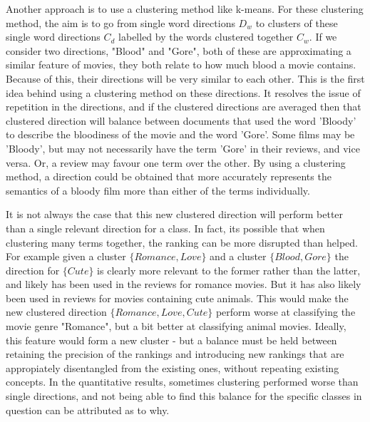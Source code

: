 Another approach is to use a clustering method like k-means. For these clustering method, the aim is to go from single word directions $D_w$ to clusters of these single word directions $C_d$ labelled by the words clustered together $C_w$.
If we consider two directions, "Blood" and "Gore", both of these are approximating a similar feature of movies, they both relate to how much blood a movie contains. Because of this, their directions will be very similar to each other. This is the first idea behind using a clustering method on these directions. It  resolves the issue of repetition in the directions, and if the clustered directions are averaged then that clustered direction will balance between documents that used the word 'Bloody' to describe the bloodiness of the movie and the word 'Gore'. Some films may be 'Bloody', but may not necessarily have the term 'Gore' in their reviews, and vice versa. Or, a review may favour one term over the other. By using a clustering method, a direction could be obtained that more accurately represents the semantics of a bloody film more than either of the terms individually. 

It is not always the case that this new clustered direction will perform better than a single relevant direction for a class. In fact, its possible that when clustering many terms together, the ranking can be more disrupted than helped. For example given a cluster  $\{Romance, Love\}$ and a cluster $\{Blood, Gore\}$ the direction for $\{Cute\}$ is clearly more relevant to the former rather than the latter, and likely has been used in the reviews for romance movies. But it has also likely been used in reviews for movies containing cute animals. This would make the new clustered direction $\{Romance, Love, Cute\}$ perform worse at classifying the movie genre "Romance", but a bit better at classifying animal movies. Ideally, this feature would form a new cluster - but a balance must be held between retaining the precision of the rankings and introducing new rankings that are appropiately disentangled from the existing ones, without repeating existing concepts. In the quantitative results, sometimes clustering performed worse than single directions, and not being able to find this balance for the specific classes in question can be attributed as to why.


